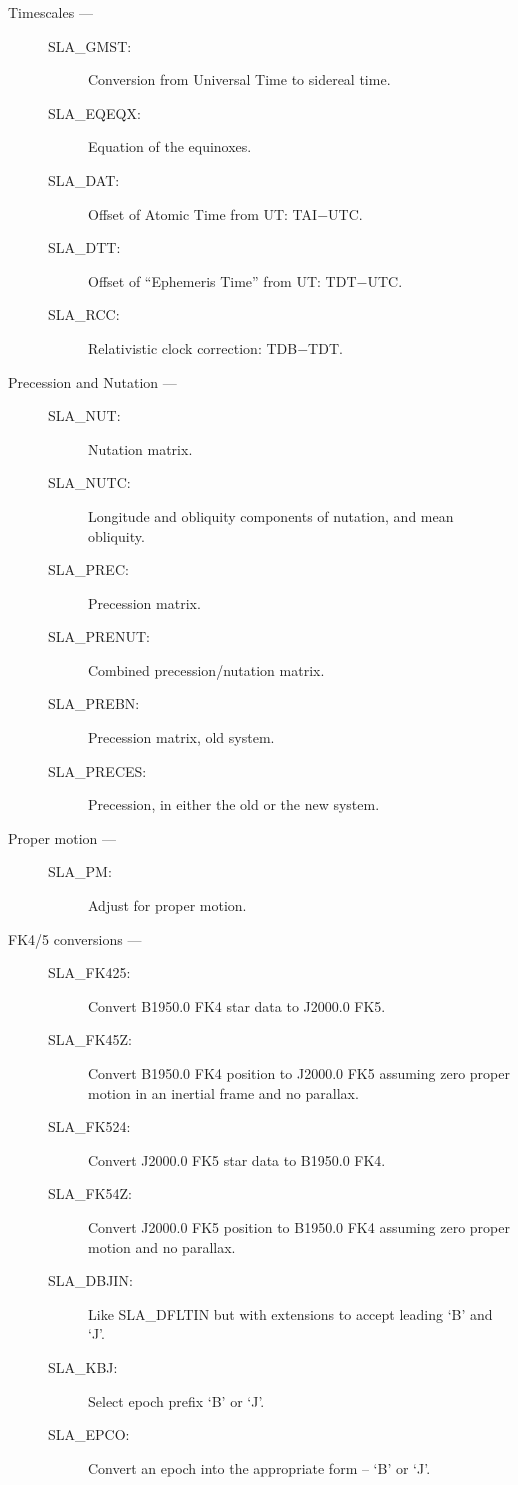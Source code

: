 \begin{description}
\item [Timescales ---]

\begin{description}
\item [SLA\_GMST:]  Conversion from Universal Time to sidereal time.
\item [SLA\_EQEQX:]  Equation of the equinoxes.
\item [SLA\_DAT:]  Offset of Atomic Time from UT: TAI$-$UTC.
\item [SLA\_DTT:]  Offset of ``Ephemeris Time'' from UT: TDT$-$UTC.
\item [SLA\_RCC:]  Relativistic clock correction: TDB$-$TDT.
\end{description}

\item [Precession and Nutation ---]

\begin{description}
\item [SLA\_NUT:]  Nutation matrix.
\item [SLA\_NUTC:]  Longitude and obliquity components of nutation, and mean obliquity.
\item [SLA\_PREC:]  Precession matrix.
\item [SLA\_PRENUT:]  Combined precession/nutation matrix.
\item [SLA\_PREBN:]  Precession matrix, old system.
\item [SLA\_PRECES:]  Precession, in either the old or the new system.
\end{description}

\item [Proper motion ---]

\begin{description}
\item [SLA\_PM:]  Adjust for proper motion.
\end{description}

\item [FK4/5 conversions ---]

\begin{description}
\item [SLA\_FK425:]  Convert B1950.0 FK4 star data to J2000.0 FK5.
\item [SLA\_FK45Z:]  Convert B1950.0 FK4 position to J2000.0 FK5 assuming zero proper motion in an inertial frame and no parallax.
\item [SLA\_FK524:]  Convert J2000.0 FK5 star data to B1950.0 FK4.
\item [SLA\_FK54Z:]  Convert J2000.0 FK5 position to B1950.0 FK4 assuming zero proper motion and no parallax.
\item [SLA\_DBJIN:]  Like SLA\_DFLTIN but with extensions to accept leading `B' and `J'.
\item [SLA\_KBJ:]  Select epoch prefix `B' or `J'.
\item [SLA\_EPCO:]  Convert an epoch into the appropriate form -- `B' or `J'.
\end{description}


\end{description}
